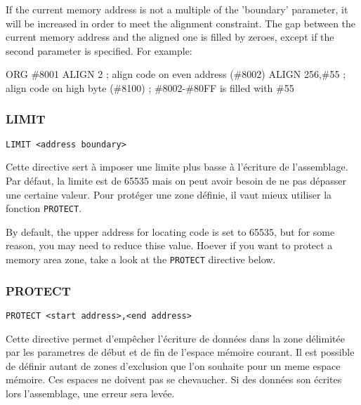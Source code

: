 \begin{xen}
If the current memory address is not a multiple of the 'boundary' parameter, it will be increased in order to meet the alignment constraint.
The gap between the current memory address and the aligned one is filled by zeroes, except if the second parameter is specified. For example:
\end{xen}

\begin{code}
ORG \#8001
ALIGN 2       ; align code on even address (\#8002)
ALIGN 256,\#55 ; align code on high byte (\#8100)
; \#8002-\#80FF is filled with \#55
\end{code}

\subsubsection{LIMIT}
\begin{verbatim}
LIMIT <address boundary>
\end{verbatim}

\begin{xfr}
Cette directive sert à imposer une limite plus basse à l'écriture de l'assemblage.
Par défaut, la limite est de 65535 mais on peut avoir besoin de ne pas dépasser une certaine valeur.
Pour protéger une zone définie, il vaut mieux utiliser la fonction \texttt{PROTECT}.
\end{xfr}

\begin{xen}
By default, the upper address for locating code is set to 65535, but for some reason, you may need to
reduce thise value.
Hoever if you want to protect a memory area zone, take a look at the \texttt{PROTECT} directive below.
\end{xen}

\subsubsection{PROTECT}
\begin{verbatim}
PROTECT <start address>,<end address>
\end{verbatim}

\begin{xfr}
Cette directive permet d'empêcher l'écriture de données dans la zone délimitée par les parametres de début et de fin de l'espace mémoire courant.
Il est possible de définir autant de zones d'exclusion que l'on souhaite pour un meme espace mémoire. Ces espaces ne doivent pas se chevaucher.
Si des données son écrites lors l'assemblage, une erreur sera levée.
\end{xfr}

